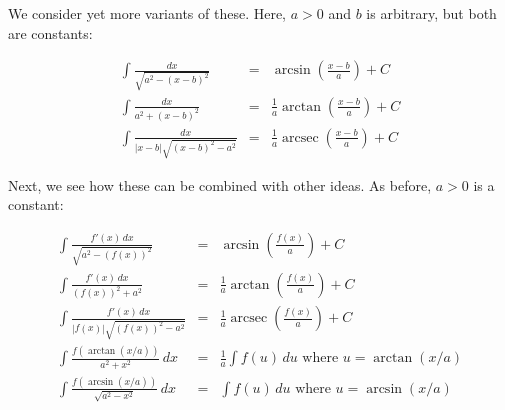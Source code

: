 \documentclass{amsart}
\begin{document}
We consider yet more variants of these. Here, $a > 0$ and $b$ is
arbitrary, but both are constants:

\begin{eqnarray*}
  \int \frac{dx}{\sqrt{a^2 - (x - b)^2}} & = & \arcsin\left(\frac{x - b}{a}\right) + C\\
  \int \frac{dx}{a^2 + (x - b)^2} & = & \frac{1}{a} \arctan \left(\frac{x - b}{a} \right) + C\\
  \int \frac{dx}{|x - b|\sqrt{(x - b)^2 - a^2}} & = & \frac{1}{a} \operatorname{arcsec}\left(\frac{x - b}{a}\right) + C
\end{eqnarray*}

Next, we see how these can be combined with other ideas. As before, $a
> 0$ is a constant:

\begin{eqnarray*}
  \int \frac{f'(x) \, dx}{\sqrt{a^2 - (f(x))^2}} & = & \arcsin\left(\frac{f(x)}{a}\right) + C\\
  \int \frac{f'(x) \, dx}{(f(x))^2 + a^2} & = & \frac{1}{a}\arctan\left(\frac{f(x)}{a}\right) + C\\
  \int \frac{f'(x) \, dx}{|f(x)|\sqrt{(f(x))^2 - a^2}} & = & \frac{1}{a} \operatorname{arcsec}\left(\frac{f(x)}{a}\right) + C\\
  \int \frac{f(\arctan (x/a))}{a^2 + x^2}  \, dx& = & \frac{1}{a} \int f(u) \, du \text{ where } u = \arctan(x/a)\\
  \int \frac{f(\arcsin(x/a))}{\sqrt{a^2 - x^2}} \, dx& = & \int f(u) \, du \text{ where } u = \arcsin(x/a)
\end{eqnarray*}
\end{document}
